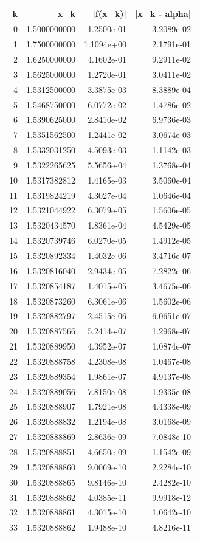 \begin{tabular}{rrrr}
\toprule
k & x_k & |f(x_k)| & |x_k - alpha| \\
\midrule
0 & 1.5000000000 & 1.2500e-01 & 3.2089e-02 \\
1 & 1.7500000000 & 1.1094e+00 & 2.1791e-01 \\
2 & 1.6250000000 & 4.1602e-01 & 9.2911e-02 \\
3 & 1.5625000000 & 1.2720e-01 & 3.0411e-02 \\
4 & 1.5312500000 & 3.3875e-03 & 8.3889e-04 \\
5 & 1.5468750000 & 6.0772e-02 & 1.4786e-02 \\
6 & 1.5390625000 & 2.8410e-02 & 6.9736e-03 \\
7 & 1.5351562500 & 1.2441e-02 & 3.0674e-03 \\
8 & 1.5332031250 & 4.5093e-03 & 1.1142e-03 \\
9 & 1.5322265625 & 5.5656e-04 & 1.3768e-04 \\
10 & 1.5317382812 & 1.4165e-03 & 3.5060e-04 \\
11 & 1.5319824219 & 4.3027e-04 & 1.0646e-04 \\
12 & 1.5321044922 & 6.3079e-05 & 1.5606e-05 \\
13 & 1.5320434570 & 1.8361e-04 & 4.5429e-05 \\
14 & 1.5320739746 & 6.0270e-05 & 1.4912e-05 \\
15 & 1.5320892334 & 1.4032e-06 & 3.4716e-07 \\
16 & 1.5320816040 & 2.9434e-05 & 7.2822e-06 \\
17 & 1.5320854187 & 1.4015e-05 & 3.4675e-06 \\
18 & 1.5320873260 & 6.3061e-06 & 1.5602e-06 \\
19 & 1.5320882797 & 2.4515e-06 & 6.0651e-07 \\
20 & 1.5320887566 & 5.2414e-07 & 1.2968e-07 \\
21 & 1.5320889950 & 4.3952e-07 & 1.0874e-07 \\
22 & 1.5320888758 & 4.2308e-08 & 1.0467e-08 \\
23 & 1.5320889354 & 1.9861e-07 & 4.9137e-08 \\
24 & 1.5320889056 & 7.8150e-08 & 1.9335e-08 \\
25 & 1.5320888907 & 1.7921e-08 & 4.4338e-09 \\
26 & 1.5320888832 & 1.2194e-08 & 3.0168e-09 \\
27 & 1.5320888869 & 2.8636e-09 & 7.0848e-10 \\
28 & 1.5320888851 & 4.6650e-09 & 1.1542e-09 \\
29 & 1.5320888860 & 9.0069e-10 & 2.2284e-10 \\
30 & 1.5320888865 & 9.8146e-10 & 2.4282e-10 \\
31 & 1.5320888862 & 4.0385e-11 & 9.9918e-12 \\
32 & 1.5320888861 & 4.3015e-10 & 1.0642e-10 \\
33 & 1.5320888862 & 1.9488e-10 & 4.8216e-11 \\
\bottomrule
\end{tabular}
